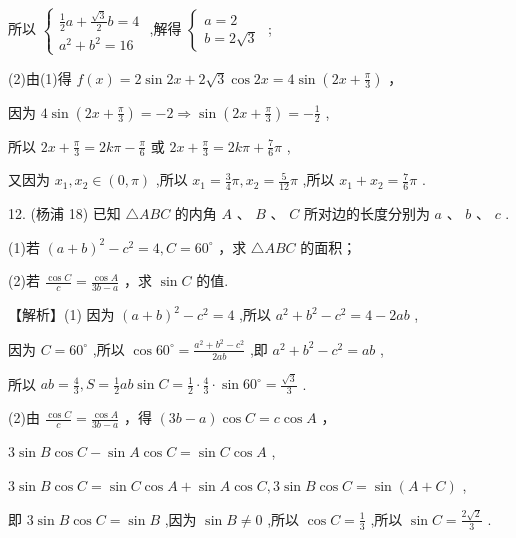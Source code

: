 \documentclass[10pt]{article}
\begin{document}
所以 \(\left\{  \begin{array}{l} \frac{1}{2}a + \frac{\sqrt{3}}{2}b = 4 \\  {a}^{2} + {b}^{2} = {16} \end{array}\right.\) ,解得 \(\left\{  \begin{array}{l} a = 2 \\  b = 2\sqrt{3} \end{array}\right.\) ;

(2)由(1)得 \(f\left( x\right)  = 2\sin {2x} + 2\sqrt{3}\cos {2x} = 4\sin \left( {{2x} + \frac{\pi }{3}}\right)\) ，

因为 \(4\sin \left( {{2x} + \frac{\pi }{3}}\right)  =  - 2 \Rightarrow  \sin \left( {{2x} + \frac{\pi }{3}}\right)  =  - \frac{1}{2}\) ,

所以 \({2x} + \frac{\pi }{3} = {2k\pi } - \frac{\pi }{6}\) 或 \({2x} + \frac{\pi }{3} = {2k\pi } + \frac{7}{6}\pi\) ,

又因为 \({x}_{1},{x}_{2} \in  \left( {0,\pi }\right)\) ,所以 \({x}_{1} = \frac{3}{4}\pi ,{x}_{2} = \frac{5}{12}\pi\) ,所以 \({x}_{1} + {x}_{2} = \frac{7}{6}\pi\) .

12. (杨浦 18) 已知 \(\bigtriangleup {ABC}\) 的内角 \(A\text{ 、 }B\text{ 、 }C\) 所对边的长度分别为 \(a\text{ 、 }b\text{ 、 }c\) .

(1)若 \({\left( a + b\right) }^{2} - {c}^{2} = 4,C = {60}^{ \circ  }\) ，求 \(\bigtriangleup  {ABC}\) 的面积；

(2)若 \(\frac{\cos C}{c} = \frac{\cos A}{{3b} - a}\) ，求 \(\sin C\) 的值.

【解析】(1) 因为 \({\left( a + b\right) }^{2} - {c}^{2} = 4\) ,所以 \({a}^{2} + {b}^{2} - {c}^{2} = 4 - {2ab}\) ,

因为 \(C = {60}^{ \circ  }\) ,所以 \(\cos {60}^{ \circ  } = \frac{{a}^{2} + {b}^{2} - {c}^{2}}{2ab}\) ,即 \({a}^{2} + {b}^{2} - {c}^{2} = {ab}\) ,

所以 \({ab} = \frac{4}{3},S = \frac{1}{2}{ab}\sin C = \frac{1}{2} \cdot  \frac{4}{3} \cdot  \sin {60}^{ \circ  } = \frac{\sqrt{3}}{3}\) .

(2)由 \(\frac{\cos C}{c} = \frac{\cos A}{{3b} - a}\) ，得 \(\left( {{3b} - a}\right) \cos C = c\cos A\) ，

\(3\sin B\cos C - \sin A\cos C = \sin C\cos A\) ,

\(3\sin B\cos C = \sin C\cos A + \sin A\cos C,3\sin B\cos C = \sin \left( {A + C}\right)\) ,

即 \(3\sin B\cos C = \sin B\) ,因为 \(\sin B \neq  0\) ,所以 \(\cos C = \frac{1}{3}\) ,所以 \(\sin C = \frac{2\sqrt{2}}{3}\) .
\end{document}
